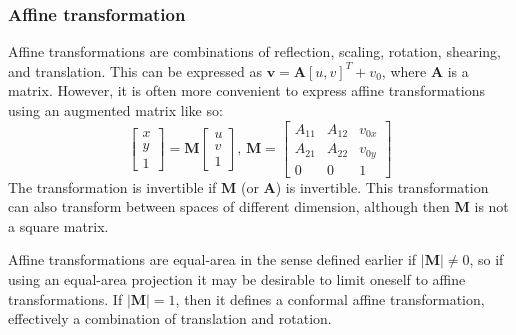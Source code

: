 \documentclass{amsart}[12pt]
\begin{document}
\subsubsection{Affine transformation}
Affine transformations are combinations of reflection, scaling, rotation,
shearing, and translation. This can be expressed as $\mathbf v = \mathbf A [u,
v]^T + v_0$, where $\mathbf A$ is a matrix. However, it is often more
convenient to express affine transformations using an augmented matrix like so:
\begin{equation}
  \begin{bmatrix}  x \\  y \\  1 \end{bmatrix}
   = \mathbf M
    \begin{bmatrix}  u \\  v \\  1 \end{bmatrix},\,
    \mathbf M = \begin{bmatrix}
       A_{11} & A_{12} & v_{0x} \\
       A_{21} & A_{22} & v_{0y} \\
       0 & 0 & 1
       \end{bmatrix}
\end{equation}
The transformation is invertible if $\mathbf M$ (or $\mathbf A$) is
invertible. This transformation can also transform between spaces of different
dimension, although then $\mathbf M$ is not a square matrix.

Affine transformations are equal-area in the sense defined earlier if
$|\mathbf M| \ne 0$, so if using an equal-area projection it may be desirable
to limit oneself to affine transformations. If $|\mathbf M| = 1$, then it defines a conformal affine transformation, effectively a combination of translation and rotation.
\end{document}
